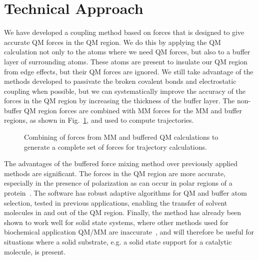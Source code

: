 \documentclass[11pt]{revtex4}
\begin{document}
\section{Technical Approach}

We have developed a coupling method based on forces that is designed
to give accurate QM forces in the QM region.  We do this by applying
the QM calculation not only to the atoms where we need QM forces, but
also to a buffer layer of surrounding atoms.  These atoms are present to
insulate our QM region from edge effects, but their QM forces are ignored.
We still take advantage of the methods developed to passivate the broken
covalent bonds and electrostatic coupling when possible, but we can
systematically improve the accuracy of the forces in the QM region by
increasing the thickness of the buffer layer.  The non-buffer QM region
forces are combined with MM forces for the MM and buffer regions, as shown
in Fig.~\ref{fig:buffered_hybrid_diagram}, and used to compute trajectories.

\begin{figure}
\centerline{}
\caption{Combining of forces from MM and buffered QM calculations
to generate a complete set of forces for trajectory calculations.}
\label{fig:buffered_hybrid_diagram}
\end{figure}

The advantages of the buffered force mixing method over previously
applied methods are significant.  The forces in the QM region are
more accurate, especially in the presence of polarization as can
occur in polar regions of a protein~\cite{solt_j_phys_chem_b_2009a}.  The software has
robust adaptive algorithms for QM and buffer atom selection, tested
in previous applications, enabling the transfer of solvent molecules
in and out of the QM region.  Finally, the method has already been
shown to work well for solid state systems, where other methods
used for biochemical application QM/MM are inaccurate~\cite{bernstein_rep_prog_phys_2009a},
and will therefore be useful for situations where a solid
substrate, e.g. a solid state support for a catalytic molecule,
is present.
\end{document}
